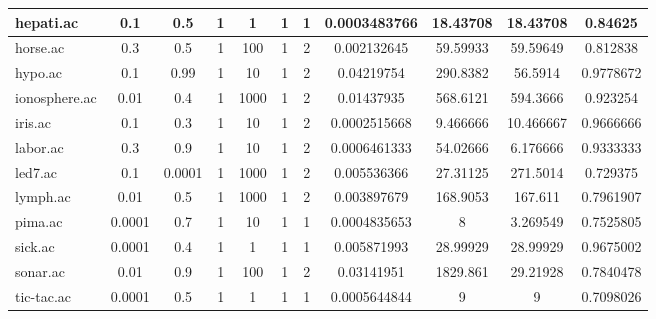 \begin{table}[htbp]
\begin{tabular}{|l|c|c|c|c|c|c|c|c|c|c|}
		\hline
		hepati.ac      & 0.1      & 0.5         & 1              & 1                   & 1             & 1             & 0.0003483766   & 18.43708       & 18.43708       & 0.84625        \\
		\hline
		horse.ac       & 0.3      & 0.5         & 1              & 100                 & 1             & 2             & 0.002132645    & 59.59933       & 59.59649       & 0.812838       \\
		\hline
		hypo.ac        & 0.1      & 0.99        & 1              & 10                  & 1             & 2             & 0.04219754     & 290.8382       & 56.5914        & 0.9778672      \\
		\hline
		ionosphere.ac  & 0.01     & 0.4         & 1              & 1000                & 1             & 2             & 0.01437935     & 568.6121       & 594.3666       & 0.923254       \\
		\hline
		iris.ac        & 0.1      & 0.3         & 1              & 10                  & 1             & 2             & 0.0002515668   & 9.466666       & 10.466667      & 0.9666666      \\
		\hline
		labor.ac       & 0.3      & 0.9         & 1              & 10                  & 1             & 2             & 0.0006461333   & 54.02666       & 6.176666       & 0.9333333      \\
		\hline
		led7.ac        & 0.1      & 0.0001      & 1              & 1000                & 1             & 2             & 0.005536366    & 27.31125       & 271.5014       & 0.729375       \\
		\hline
		lymph.ac       & 0.01     & 0.5         & 1              & 1000                & 1             & 2             & 0.003897679    & 168.9053       & 167.611        & 0.7961907      \\
		\hline
		pima.ac        & 0.0001   & 0.7         & 1              & 10                  & 1             & 1             & 0.0004835653   & 8              & 3.269549       & 0.7525805      \\
		\hline
		sick.ac        & 0.0001   & 0.4         & 1              & 1                   & 1             & 1             & 0.005871993    & 28.99929       & 28.99929       & 0.9675002      \\
		\hline
		sonar.ac       & 0.01     & 0.9         & 1              & 100                 & 1             & 2             & 0.03141951     & 1829.861       & 29.21928       & 0.7840478      \\
		\hline
		tic-tac.ac     & 0.0001   & 0.5         & 1              & 1                   & 1             & 1             & 0.0005644844   & 9              & 9              & 0.7098026      \\

\end{tabular}
\end{table}
